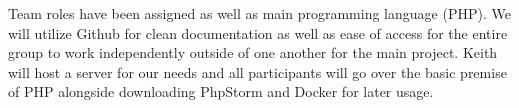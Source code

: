 Team roles have been assigned as well as main programming language (PHP).
We will utilize Github for clean documentation as well as ease of access for the entire group
to work independently outside of one another for the main project. Keith will host
a server for our needs and all participants will go over the basic premise of PHP alongside
downloading PhpStorm and Docker for later usage.
